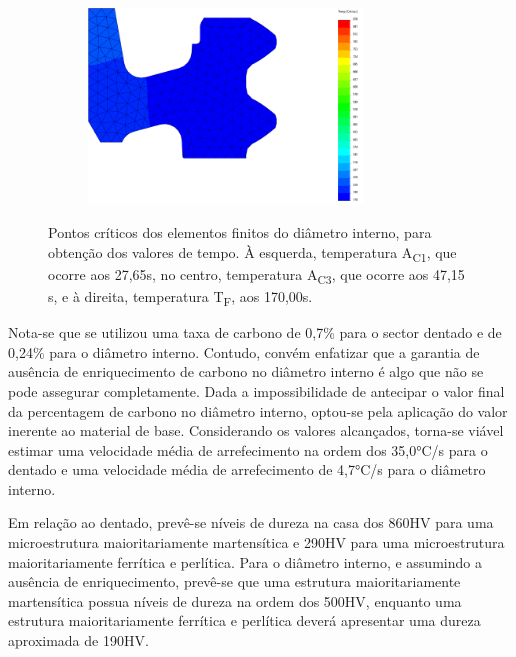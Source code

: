 \begin{figure}[htb]
\begin{subfigure}{.33\textwidth}
        \caption{}
        \label{fig:A1_Dint}
    \end{subfigure}
    \begin{subfigure}{.33\textwidth}
        \centering
        \includegraphics[width = 0.8\textwidth]{Figures/Cap4/TF_Diametro.png}
        \caption{}
        \label{fig:Tf_Dint}
    \end{subfigure}
    \caption[Pontos críticos dos elementos finitos do diâmetro interno]%
    {Pontos críticos dos elementos finitos do diâmetro interno, para obtenção dos valores de tempo. À esquerda, temperatura A\textsubscript{C1}, que ocorre aos 27,65s, no centro, temperatura A\textsubscript{C3}, que ocorre aos 47,15 s, e à direita, temperatura T\textsubscript{F}, aos 170,00s.}
    \label{fig:Diametro}
\end{figure}
\par
Nota-se que se utilizou uma taxa de carbono de 0,7\% para o sector dentado e de 0,24\% para o diâmetro interno. Contudo, convém enfatizar que a garantia de ausência de enriquecimento de carbono no diâmetro interno é algo que não se pode assegurar completamente. Dada a impossibilidade de antecipar o valor final da percentagem de carbono no diâmetro interno, optou-se pela aplicação do valor inerente ao material de base. Considerando os valores alcançados, torna-se viável estimar uma velocidade média de arrefecimento na ordem dos 35,0°C/s para o dentado e uma velocidade média de arrefecimento de 4,7°C/s para o diâmetro interno.
\par
Em relação ao dentado, prevê-se níveis de dureza na casa dos 860HV para uma microestrutura maioritariamente martensítica e 290HV para uma microestrutura maioritariamente ferrítica e perlítica. Para o diâmetro interno, e assumindo a ausência de enriquecimento, prevê-se que uma estrutura maioritariamente martensítica possua níveis de dureza na ordem dos 500HV, enquanto uma estrutura maioritariamente ferrítica e perlítica deverá apresentar uma dureza aproximada de 190HV.
